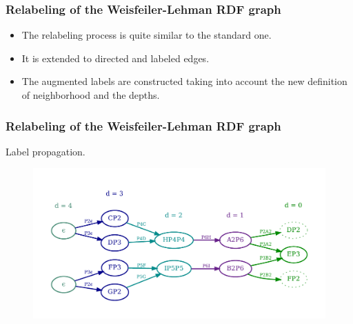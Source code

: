 \documentclass{beamer}
\begin{document}
\begin{frame}
\frametitle{Relabeling of the Weisfeiler-Lehman RDF graph}

\begin{itemize}
\item
The relabeling process is quite similar to the standard one.

\item
It is extended to directed and labeled edges.

\item
The augmented labels are constructed taking into account the new definition of neighborhood and the depths.
\end{itemize}

\end{frame}


\begingroup
\small
\begin{frame}
\frametitle{Relabeling of the Weisfeiler-Lehman RDF graph}

Label propagation.

\begin{center}
\begin{figure}
\includegraphics[width=\textwidth,keepaspectratio]{img/07-almost_relabeled}
\end{figure}
\end{center}

\end{frame}
\endgroup

\end{document}
